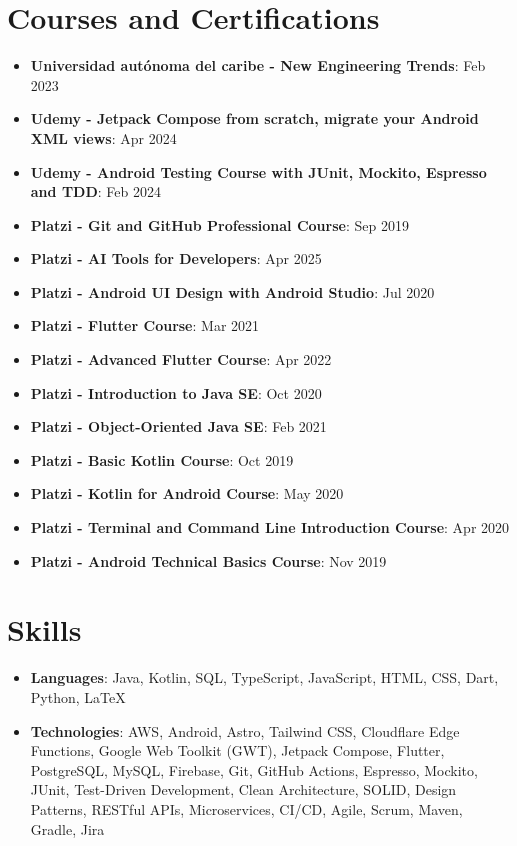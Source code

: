 \documentclass[letterpaper,11pt]{article}
\newcommand{\resumeItem}[2]{
  \item\small{
    \textbf{#1}{: #2 \vspace{-2pt}}
  }
}
\newcommand{\resumeSubItem}[2]{\resumeItem{#1}{#2}\vspace{-4pt}}
\newcommand{\resumeSubHeadingListStart}{\begin{itemize}[leftmargin=*]}
\newcommand{\resumeSubHeadingListEnd}{\end{itemize}}
\begin{document}
\section{Courses and Certifications}
\resumeSubHeadingListStart
\resumeSubItem{Universidad autónoma del caribe - New Engineering Trends}{Feb 2023}
\resumeSubItem{Udemy - Jetpack Compose from scratch, migrate your Android XML views}{Apr 2024}
\resumeSubItem{Udemy - Android Testing Course with JUnit, Mockito, Espresso and TDD}{Feb 2024}
\resumeSubItem{Platzi - Git and GitHub Professional Course}{Sep 2019}
\resumeSubItem{Platzi - AI Tools for Developers}{Apr 2025}
\resumeSubItem{Platzi - Android UI Design with Android Studio}{Jul 2020}
\resumeSubItem{Platzi - Flutter Course}{Mar 2021}
\resumeSubItem{Platzi - Advanced Flutter Course}{Apr 2022}
\resumeSubItem{Platzi - Introduction to Java SE}{Oct 2020}
\resumeSubItem{Platzi - Object-Oriented Java SE}{Feb 2021}
\resumeSubItem{Platzi - Basic Kotlin Course}{Oct 2019}
\resumeSubItem{Platzi - Kotlin for Android Course}{May 2020}
\resumeSubItem{Platzi - Terminal and Command Line Introduction Course}{Apr 2020}
\resumeSubItem{Platzi - Android Technical Basics Course}{Nov 2019}
\resumeSubHeadingListEnd

\section{Skills}
\resumeSubHeadingListStart
\item{
            \textbf{Languages}{: Java, Kotlin, SQL, TypeScript, JavaScript, HTML, CSS, Dart, Python, LaTeX}
            
      }
\item {
            \textbf{Technologies}{: AWS, Android, Astro, Tailwind CSS, Cloudflare Edge Functions, Google Web Toolkit (GWT), Jetpack Compose, Flutter, PostgreSQL, MySQL, Firebase, Git, GitHub Actions, Espresso, Mockito, JUnit, Test-Driven Development, Clean Architecture, SOLID, Design Patterns, RESTful APIs, Microservices, CI/CD, Agile, Scrum, Maven, Gradle, Jira}
      }
\resumeSubHeadingListEnd


\end{document}
